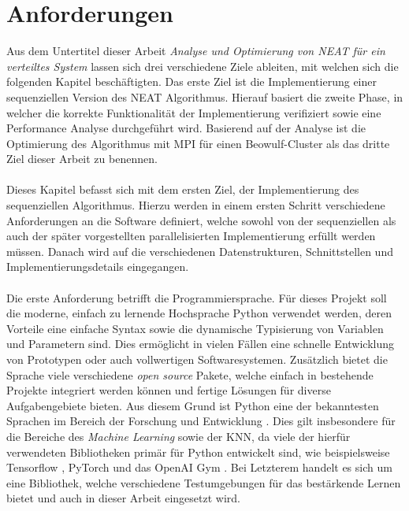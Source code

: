\section{Anforderungen}
\label{sec:requirements}
Aus dem Untertitel dieser Arbeit \emph{Analyse und Optimierung von \ac{NEAT} für ein verteiltes System} lassen sich drei verschiedene Ziele ableiten, mit welchen sich die folgenden Kapitel beschäftigten. Das erste Ziel ist die Implementierung einer sequenziellen Version des \ac{NEAT} Algorithmus. Hierauf basiert die zweite Phase, in welcher die korrekte Funktionalität der Implementierung verifiziert sowie eine Performance Analyse durchgeführt wird. Basierend auf der Analyse ist die Optimierung des Algorithmus mit \ac{MPI} für einen Beowulf-Cluster als das dritte Ziel dieser Arbeit zu benennen.
\\\\
Dieses Kapitel befasst sich mit dem ersten Ziel, der Implementierung des sequenziellen Algorithmus. Hierzu werden in einem ersten Schritt verschiedene Anforderungen an die Software definiert, welche sowohl von der sequenziellen als auch der später vorgestellten parallelisierten Implementierung erfüllt werden müssen. Danach wird auf die verschiedenen Datenstrukturen, Schnittstellen und Implementierungsdetails eingegangen.
\\\\
Die erste Anforderung betrifft die Programmiersprache. Für dieses Projekt soll die moderne, einfach zu lernende Hochsprache Python verwendet werden, deren Vorteile eine einfache Syntax sowie die dynamische Typisierung von Variablen und Parametern sind. Dies ermöglicht in vielen Fällen eine schnelle Entwicklung von Prototypen oder auch vollwertigen Softwaresystemen. Zusätzlich bietet die Sprache viele verschiedene \emph{open source} Pakete, welche einfach in bestehende Projekte integriert werden können und fertige Lösungen für diverse Aufgabengebiete bieten. Aus diesem Grund ist Python eine der bekanntesten Sprachen im Bereich der Forschung und Entwicklung \cite{dalcin2011parallel}. Dies gilt insbesondere für die Bereiche des \emph{Machine Learning} sowie der \ac{KNN}, da viele der hierfür verwendeten Bibliotheken primär für Python entwickelt sind, wie beispielsweise Tensorflow \cite{tensorflow2015}, PyTorch \cite{pytorch2019} und das OpenAI Gym \cite{OpenAiGym2016}. Bei Letzterem handelt es sich um eine Bibliothek, welche verschiedene Testumgebungen für das bestärkende Lernen bietet und auch in dieser Arbeit eingesetzt wird.  
\\\\
